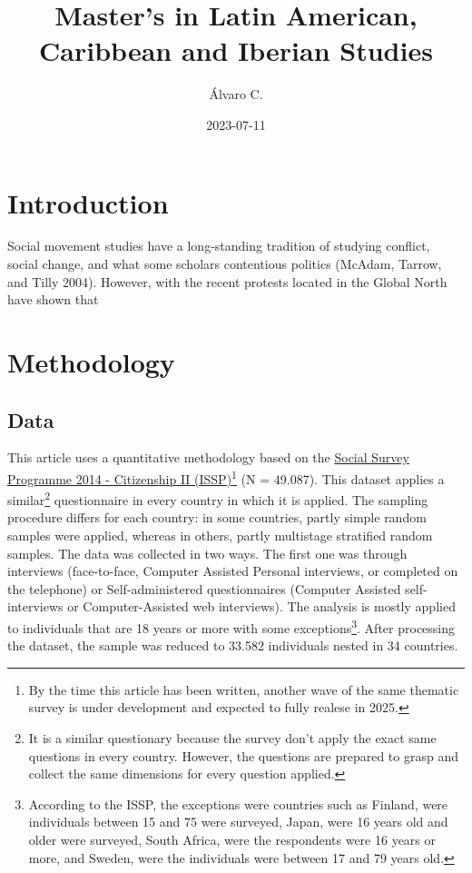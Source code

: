 \documentclass[
]{article}
\title{Master's in Latin American, Caribbean and Iberian Studies}
\author{Álvaro C.}
\date{2023-07-11}
\begin{document}
\maketitle

{
\setcounter{tocdepth}{2}
\tableofcontents
}
\hypertarget{introduction}{%
\section{Introduction}\label{introduction}}

Social movement studies have a long-standing tradition of studying
conflict, social change, and what some scholars contentious politics
(McAdam, Tarrow, and Tilly 2004). However, with the recent protests
located in the Global North have shown that

\hypertarget{methodology}{%
\section{Methodology}\label{methodology}}

\hypertarget{data}{%
\subsection{Data}\label{data}}

This article uses a quantitative methodology based on the
\href{https://www.gesis.org/en/issp/modules/issp-modules-by-topic/citizenship/2014}{Social
Survey Programme 2014 - Citizenship II (ISSP)}\footnote{By the time this
  article has been written, another wave of the same thematic survey is
  under development and expected to fully realese in 2025.} (N =
49.087). This dataset applies a similar\footnote{It is a similar
  questionary because the survey don't apply the exact same questions in
  every country. However, the questions are prepared to grasp and
  collect the same dimensions for every question applied.} questionnaire
in every country in which it is applied. The sampling procedure differs
for each country: in some countries, partly simple random samples were
applied, whereas in others, partly multistage stratified random samples.
The data was collected in two ways. The first one was through interviews
(face-to-face, Computer Assisted Personal interviews, or completed on
the telephone) or Self-administered questionnaires (Computer Assisted
self-interviews or Computer-Assisted web interviews). The analysis is
mostly applied to individuals that are 18 years or more with some
exceptions\footnote{According to the ISSP, the exceptions were countries
  such as Finland, were individuals between 15 and 75 were surveyed,
  Japan, were 16 years old and older were surveyed, South Africa, were
  the respondents were 16 years or more, and Sweden, were the
  individuals were between 17 and 79 years old.}. After processing the
dataset, the sample was reduced to 33.582 individuals nested in 34
countries.
\end{document}
